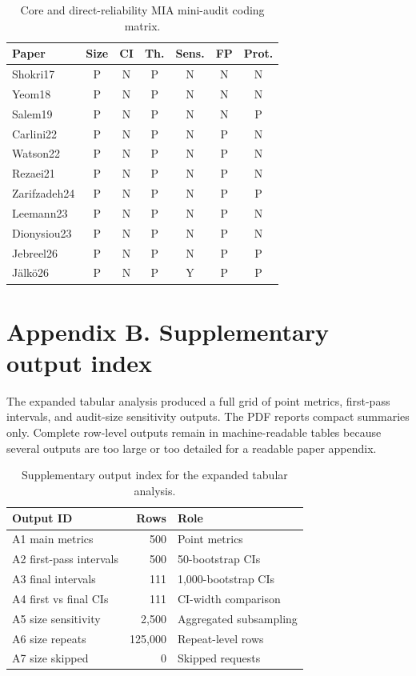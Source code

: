 \documentclass[
  10pt,
  twocolumn]{article}
\begin{document}
\begin{table}[H]
\centering
\scriptsize
\caption{Core and direct-reliability MIA mini-audit coding matrix.}
\label{tab:appendix-reporting-audit-matrix}
\setlength{\tabcolsep}{3pt}
\begin{tabular}{@{}l c c c c c c@{}}
\toprule
Paper & Size & CI & Th. & Sens. & FP & Prot. \\
\midrule
Shokri17 & P & N & P & N & N & N \\
Yeom18 & P & N & P & N & N & N \\
Salem19 & P & N & P & N & N & P \\
Carlini22 & P & N & P & N & P & N \\
Watson22 & P & N & P & N & P & N \\
Rezaei21 & P & N & P & N & P & N \\
Zarifzadeh24 & P & N & P & N & P & P \\
Leemann23 & P & N & P & N & P & N \\
Dionysiou23 & P & N & P & N & P & N \\
Jebreel26 & P & N & P & N & P & P \\
Jälkö26 & P & N & P & Y & P & P \\
\bottomrule
\end{tabular}
\end{table}

\hypertarget{appendix-b-supplementary-output-index}{%
\section{Appendix B. Supplementary output index}\label{appendix-b-supplementary-output-index}}

The expanded tabular analysis produced a full grid of point metrics, first-pass intervals, and audit-size sensitivity outputs. The PDF reports compact summaries only. Complete row-level outputs remain in machine-readable tables because several outputs are too large or too detailed for a readable paper appendix.

\begin{table}[H]
\centering
\scriptsize
\caption{Supplementary output index for the expanded tabular analysis.}
\label{tab:appendix-csv-manifest}
\begin{tabular}{l r l}
\toprule
Output ID & Rows & Role \\
\midrule
A1 main metrics & 500 & Point metrics \\
A2 first-pass intervals & 500 & 50-bootstrap CIs \\
A3 final intervals & 111 & 1,000-bootstrap CIs \\
A4 first vs final CIs & 111 & CI-width comparison \\
A5 size sensitivity & 2,500 & Aggregated subsampling \\
A6 size repeats & 125,000 & Repeat-level rows \\
A7 size skipped & 0 & Skipped requests \\
\bottomrule
\end{tabular}
\end{table}
\end{document}
